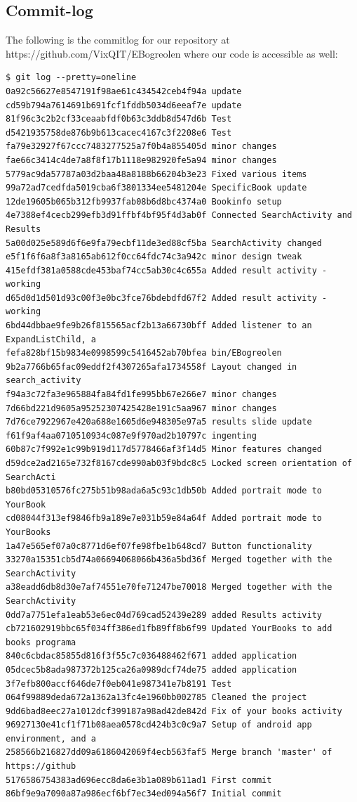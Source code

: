 \documentclass[12pt]{article}
\begin{document}
\subsection{Commit-log}
\label{Commit-log}
The following is the commitlog for our repository at https://github.com/VixQIT/EBogreolen where our code is accessible as well:
\begin{verbatim}
$ git log --pretty=oneline
0a92c56627e8547191f98ae61c434542ceb4f94a update
cd59b794a7614691b691fcf1fddb5034d6eeaf7e update
81f96c3c2b2cf33ceaabfdf0b63c3ddb8d547d6b Test
d5421935758de876b9b613cacec4167c3f2208e6 Test
fa79e32927f67ccc7483277525a7f0b4a855405d minor changes
fae66c3414c4de7a8f8f17b1118e982920fe5a94 minor changes
5779ac9da57787a03d2baa48a8188b66204b3e23 Fixed various items
99a72ad7cedfda5019cba6f3801334ee5481204e SpecificBook update
12de19605b065b312fb9937fab08b6d8bc4374a0 Bookinfo setup
4e7388ef4cecb299efb3d91ffbf4bf95f4d3ab0f Connected SearchActivity and Results
5a00d025e589d6f6e9fa79ecbf11de3ed88cf5ba SearchActivity changed
e5f1f6f6a8f3a8165ab612f0cc64fdc74c3a942c minor design tweak
415efdf381a0588cde453baf74cc5ab30c4c655a Added result activity - working
d65d0d1d501d93c00f3e0bc3fce76bdebdfd67f2 Added result activity - working
6bd44dbbae9fe9b26f815565acf2b13a66730bff Added listener to an ExpandListChild, a
fefa828bf15b9834e0998599c5416452ab70bfea bin/EBogreolen
9b2a7766b65fac09eddf2f4307265afa1734558f Layout changed in search_activity
f94a3c72fa3e965884fa84fd1fe995bb67e266e7 minor changes
7d66bd221d9605a95252307425428e191c5aa967 minor changes
7d76ce7922967e420a688e1605d6e948305e97a5 results slide update
f61f9af4aa0710510934c087e9f970ad2b10797c ingenting
60b87c7f992e1c99b919d117d5778466af3f14d5 Minor features changed
d59dce2ad2165e732f8167cde990ab03f9bdc8c5 Locked screen orientation of SearchActi
b80bd05310576fc275b51b98ada6a5c93c1db50b Added portrait mode to YourBook
cd08044f313ef9846fb9a189e7e031b59e84a64f Added portrait mode to YourBooks
1a47e565ef07a0c8771d6ef07fe98fbe1b648cd7 Button functionality
33270a15351cb5d74a06694068066b436a5bd36f Merged together with the SearchActivity
a38eadd6db8d30e7af74551e70fe71247be70018 Merged together with the SearchActivity
0dd7a7751efa1eab53e6ec04d769cad52439e289 added Results activity
cb721602919bbc65f034ff386ed1fb89ff8b6f99 Updated YourBooks to add books programa
840c6cbdac85855d816f3f55c7c036488462f671 added application
05dcec5b8ada987372b125ca26a0989dcf74de75 added application
3f7efb800accf646de7f0eb041e987341e7b8191 Test
064f99889deda672a1362a13fc4e1960bb002785 Cleaned the project
9dd6bad8eec27a1012dcf399187a98ad42de842d Fix of your books activity
96927130e41cf1f71b08aea0578cd424b3c0c9a7 Setup of android app environment, and a
258566b216827dd09a6186042069f4ecb563faf5 Merge branch 'master' of https://github
5176586754383ad696ecc8da6e3b1a089b611ad1 First commit
86bf9e9a7090a87a986ecf6bf7ec34ed094a56f7 Initial commit
\end{verbatim}
\end{document}
